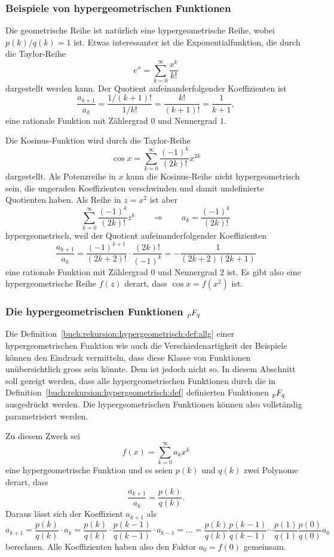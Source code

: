 %
%
\subsubsection{Beispiele von hypergeometrischen Funktionen}
Die geometrische Reihe ist natürlich eine hypergeometrische Reihe,
wobei $p(k)/q(k)=1$ ist.
Etwas interessanter ist die Exponentialfunktion, die durch die Taylor-Reihe
%
\[
e^x = \sum_{k=0}^\infty \frac{x^k}{k!}
\]
dargestellt werden kann.
Der Quotient aufeinanderfolgender Koeffizienten ist
\[
\frac{a_{k+1}}{a_k}
=
\frac{1/(k+1)!}{1/k!}
=
\frac{k!}{(k+1)!}
=
\frac{1}{k+1},
\]
eine rationale Funktion mit Zählergrad $0$ und Nennergrad $1$.

Die Kosinus-Funktion wird durch die Taylor-Reihe
\[
\cos x = \sum_{k=0}^\infty \frac{(-1)^k}{(2k)!} x^{2k}
\]
dargestellt.
Als Potenzreihe in $x$ kann die Kosinus-Reihe nicht hypergeometrisch sein,
die ungeraden Koeffizienten verschwinden und damit undefinierte
Quotienten haben.
Als Reihe in $z=x^2$ ist aber
\[
\sum_{k=0}^\infty \frac{(-1)^k}{(2k)!} z^k
\qquad\Rightarrow\qquad
a_k = \frac{(-1)^k}{(2k)!}
\]
hypergeometrisch, weil der Quotient aufeinanderfolgender Koeffizienten
\[
\frac{a_{k+1}}{a_k}
=
\frac{(-1)^{k+1}}{(2k+2)!}\cdot \frac{(2k)!}{(-1)^k}
=
-\frac{1}{(2k+2)(2k+1)}
\]
eine rationale Funktion mit Zählergrad $0$ und Nennergrad $2$ ist.
Es gibt also eine hypergeometrische Reihe $f(z)$ derart, dass
$\cos x = f(x^2)$ ist.

%
%
\subsubsection{Die hypergeometrischen Funktionen $\mathstrut_pF_q$}
Die Definition~\ref{buch:rekursion:hypergeometrisch:def:allg}
einer hypergeometrischen Funktion wie auch die Verschiedenartigkeit
der Beispiele können den Eindruck vermitteln, dass diese Klasse
von Funktionen unübersichtlich gross sein könnte.
Dem ist jedoch nicht so.
In diesem Abschnitt soll gezeigt werden, dass alle hypergeometrischen
Funktionen durch die in
Definition~\ref{buch:rekursion:hypergeometrisch:def} definierten
Funktionen $\mathstrut_pF_q$ ausgedrückt werden.
Die hypergeometrischen Funktionen können also vollständig parametrisiert
werden.

Zu diesem Zweck sei
\[
f(x)
=
\sum_{k=0}^\infty a_kx^k
\]
eine hypergeometrische Funktion und es
seien $p(k)$ und $q(k)$ zwei Polynome derart, dass
\[
\frac{a_{k+1}}{a_k} = \frac{p(k)}{q(k)}.
\]
Daraus lässt sich der Koeffizient $a_{k+1}$ als
\begin{equation}
a_{k+1}
=
\frac{p(k)}{q(k)}
\cdot
a_k
=
\frac{p(k)}{q(k)}
\cdot
\frac{p(k-1)}{q(k-1)}
\cdot
a_{k-1}
=\dots=
\frac{p(k)}{q(k)}
\frac{p(k-1)}{q(k-1)}
\cdots
\frac{p(1)}{q(1)}
\frac{p(0)}{q(0)}
a_0
\label{buch:rekursion:hypergeometrisch:ak+1}
\end{equation}
berechnen.
Alle Koeffizienten haben also den Faktor $a_0=f(0)$ gemeinsam.

